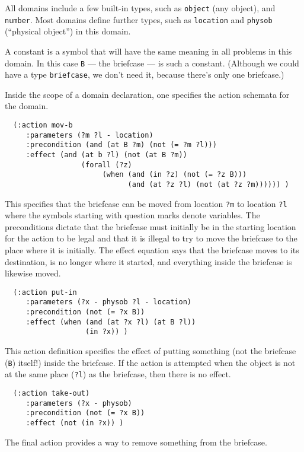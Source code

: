 All domains include a few built-in types, such as {\tt object} (any object),
and {\tt number}.  Most domains define further types, such as {\tt location}
and {\tt physob} (``physical object'')
in this domain.

A constant is a symbol that will have the same meaning in all problems
in this domain.  In this case {\tt B} --- the briefcase --- is such a constant.
(Although we could have a type {\tt briefcase}, we don't need it, 
because there's only one briefcase.)

Inside the scope of a domain declaration, one specifies the action
schemata for the domain. 

\begin{verbatim}
  (:action mov-b
     :parameters (?m ?l - location)
     :precondition (and (at B ?m) (not (= ?m ?l)))
     :effect (and (at b ?l) (not (at B ?m))
                  (forall (?z)
                       (when (and (in ?z) (not (= ?z B)))
                             (and (at ?z ?l) (not (at ?z ?m)))))) )
\end{verbatim}

This specifies that the briefcase can be moved from location {\tt ?m}
to location {\tt ?l} where the symbols starting with question marks denote
variables. The preconditions dictate that the briefcase must initially
be in the starting location for the action to be legal and that it is
illegal to try to move the briefcase to the place where it is
initially. The effect equation says that the briefcase moves to its
destination, is no longer where it started, and everything inside the
briefcase is likewise moved.

\begin{verbatim}
  (:action put-in
     :parameters (?x - physob ?l - location)
     :precondition (not (= ?x B))
     :effect (when (and (at ?x ?l) (at B ?l))
                   (in ?x)) )
\end{verbatim}

This action definition specifies the effect of putting something (not the briefcase
({\tt B}) itself!) inside the briefcase. If the action is attempted when
the object is not at the same place ({\tt ?l}) as the briefcase, then there
is no effect. 

\begin{verbatim}
  (:action take-out)
     :parameters (?x - physob)
     :precondition (not (= ?x B))
     :effect (not (in ?x)) )
\end{verbatim}
      
The final action provides a way to remove something from the briefcase.

